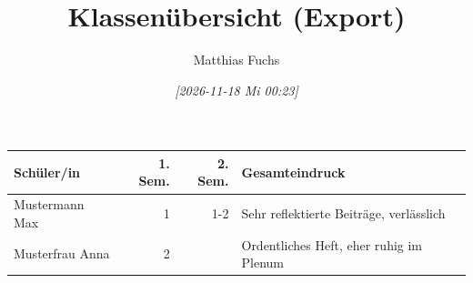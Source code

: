 \documentclass[11pt]{article}
\author{Matthias Fuchs}
\date{\textit{{[}2026-11-18 Mi 00:23]}}
\title{Klassenübersicht (Export)}
\begin{document}
\maketitle
\begin{center}
\begin{tabularx}{\textwidth}{Xrrl}
Schüler/in & 1. Sem. & 2. Sem. & Gesamteindruck\\
\hline
Mustermann Max & 1 & 1-2 & Sehr reflektierte Beiträge, verlässlich\\
Musterfrau Anna & 2 &  & Ordentliches Heft, eher ruhig im Plenum\\
\end{tabularx}
\end{center}
\end{document}
